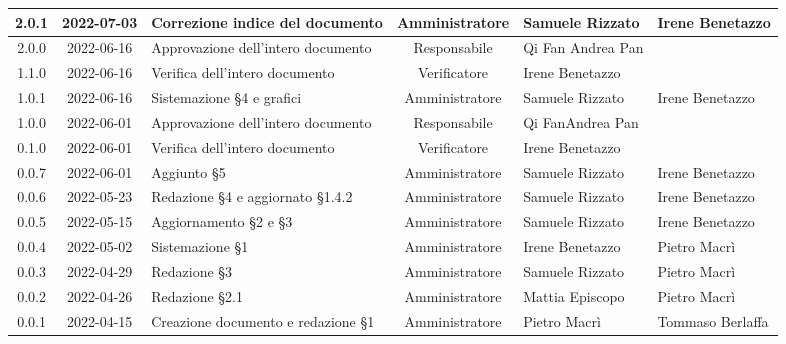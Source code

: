 \begin{center}
\begin{longtable}{ |c|c|p{8em}|c|m{5em}|m{6em}| }
		\hline
		2.0.1 & 2022-07-03 & Correzione indice del documento & Amministratore & Samuele \newline Rizzato & Irene \newline Benetazzo\\
		\hline
		2.0.0 & 2022-06-16 & Approvazione dell'intero documento & Responsabile & Qi Fan \newline Andrea Pan & \\
		\hline
		1.1.0 & 2022-06-16 & Verifica dell'intero documento & Verificatore & Irene \newline Benetazzo & \\
		\hline
		1.0.1 & 2022-06-16 & Sistemazione §4 e grafici & Amministratore & Samuele \newline Rizzato & Irene \newline Benetazzo \\
		\hline
		1.0.0 & 2022-06-01 & Approvazione dell'intero documento & Responsabile &Qi Fan\newline Andrea Pan & \\
		\hline
		0.1.0 & 2022-06-01 & Verifica dell'intero documento & Verificatore &Irene \newline Benetazzo & \\
		\hline
		0.0.7 & 2022-06-01 & Aggiunto §5 & Amministratore & Samuele \newline Rizzato & Irene \newline Benetazzo \\
		\hline
		0.0.6 & 2022-05-23 & Redazione §4 e aggiornato §1.4.2 & Amministratore & Samuele \newline Rizzato & Irene \newline Benetazzo \\
		\hline
		0.0.5 & 2022-05-15 & Aggiornamento §2 e §3 & Amministratore & Samuele \newline Rizzato & Irene \newline Benetazzo \\
		\hline
		0.0.4 & 2022-05-02 & Sistemazione §1 & Amministratore & Irene \newline Benetazzo & Pietro \newline Macrì\\
		\hline
		0.0.3 & 2022-04-29 & Redazione §3 & Amministratore & Samuele \newline Rizzato & Pietro \newline Macrì\\
		\hline
		0.0.2 & 2022-04-26 & Redazione §2.1 & Amministratore & Mattia \newline Episcopo & Pietro \newline Macrì\\
		\hline
		0.0.1 & 2022-04-15 & Creazione documento e redazione §1 & Amministratore & Pietro \newline Macrì & Tommaso \newline Berlaffa\\
		\hline
	\end{longtable}
	\end{center}
	\newpage